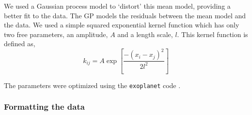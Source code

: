 We used a Gaussian process model to `distort' this mean model, providing a
better fit to the data.
The GP models the residuals between the mean model and the data.
We used a simple squared exponential kernel function which has only two free
parameters, an amplitude, $A$ and a length scale, $l$.
This kernel function is defined as,
\begin{equation}
k_{ij} = A \exp\left[{\frac{-(x_i - x_j)^2}{2l^2}}\right]
\end{equation}

The parameters were optimized using the {\tt exoplanet} code \citep{exoplanet}.

\subsubsection{Formatting the data}

